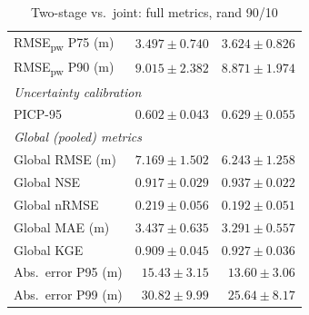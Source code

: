 \begin{table}[htbp]
\begin{tabular}{lrr}
RMSE\textsubscript{pw} P75 (m)              & $3.497 \pm 0.740$ & $3.624 \pm 0.826$ \\
RMSE\textsubscript{pw} P90 (m)              & $9.015 \pm 2.382$ & $8.871 \pm 1.974$ \\[3pt]
\multicolumn{3}{l}{\textit{Uncertainty calibration}} \\[2pt]
PICP-95                                     & $0.602 \pm 0.043$ & $0.629 \pm 0.055$ \\[3pt]
\multicolumn{3}{l}{\textit{Global (pooled) metrics}} \\[2pt]
Global RMSE (m)                             & $7.169 \pm 1.502$ & $6.243 \pm 1.258$ \\
Global NSE                                  & $0.917 \pm 0.029$ & $0.937 \pm 0.022$ \\
Global nRMSE                                & $0.219 \pm 0.056$ & $0.192 \pm 0.051$ \\
Global MAE (m)                              & $3.437 \pm 0.635$ & $3.291 \pm 0.557$ \\
Global KGE                                  & $0.909 \pm 0.045$ & $0.927 \pm 0.036$ \\
Abs.\ error P95 (m)                         & $15.43 \pm 3.15$  & $13.60 \pm 3.06$ \\
Abs.\ error P99 (m)                         & $30.82 \pm 9.99$  & $25.64 \pm 8.17$ \\
\bottomrule
\end{tabular}
\caption{Two-stage vs.\ joint: full metrics, rand 90/10}
\label{tab:cross_split_full_metrics}
\end{table}

